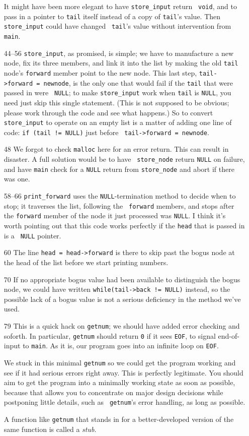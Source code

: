 \begin{itemize}
It might have been more elegant to have {\tt store\_input} return {\tt
void}, and to pass in a pointer to {\tt tail} itself instead of a copy
of {\tt tail}'s value.  Then {\tt store\_input} could have changed {\tt
tail}'s value without intervention from {\tt main}.
\item[44--56] {\tt store\_input}, as promised, is simple; we have to
manufacture a new node, fix its three members, and link it into the list
by making the old {\tt tail} node's {\tt forward} member point to the
new node.  This last step, {\tt tail->forward = newnode}, is the only
one that would fail if the {\tt tail} that were passed in were {\tt
NULL}; to make {\tt store\_input} work when {\tt tail} is {\tt NULL},
you need just skip this single statement.  (This is not supposed to be
obvious; please work through the code and see what happens.)  So to
convert {\tt store\_input} to operate on an empty list is a matter of
adding one line of code:  \mbox{\tt if (tail != NULL)} just before \mbox{\tt
tail->forward = newnode}.
\item[48] We forgot to check {\tt malloc} here for an error return.
This can result in disaster.  A full solution would be to have {\tt
store\_node} return {\tt NULL} on failure, and have {\tt main} check for
a {\tt NULL} return from {\tt store\_node} and abort if there was one.
\item[58--66] {\tt print\_forward} uses the {\tt NULL}-termination
method to decide when to stop; it traverses the list, following the {\tt
forward} members, and stops after the {\tt forward} member of the node
it just processed was {\tt NULL}.  I think it's worth pointing out that
this code works perfectly if the {\tt head} that is passed in is a {\tt
NULL} pointer.
\item[60] The line {\tt head = head->forward} is there to skip past the
bogus node at the head of the list before we start printing numbers.
\item[70] If no appropriate bogus value had been available to
distinguish the bogus node, we could have written {\tt while(tail->back
!= NULL)} instead, so the possible lack of a bogus value is not a
serious deficiency in the method we've used.
\item[79] This is a quick hack on {\tt getnum}; we should have added
error checking and soforth.  In particular, {\tt getnum} should return
{\tt 0} if it sees {\tt EOF}, to signal end-of-input to {\tt main}.  As
it is, our program goes into an infinite loop on {\tt EOF}.

We stuck in this minimal {\tt getnum} so we could get the program
working and see if it had serious errors right away.  This is perfectly
legitimate.  You should aim to get the program into a minimally working
state as soon as possible, because that allows you to concentrate on
major design decisions while postponing little details, such as {\tt
getnum}'s error handling, as long as possible.

A function like {\tt getnum} that stands in for a better-developed
version of the same function is called a {\em stub}\/.  
\end{itemize}

